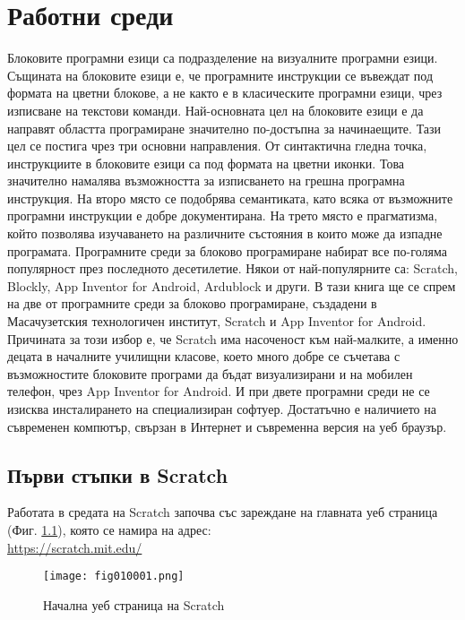 \chapter{Работни среди}

Блоковите програмни езици са подразделение на визуалните програмни езици. Същината на блоковите езици е, че програмните инструкции се въвеждат под формата на цветни блокове, а не както е в класическите програмни езици, чрез изписване на текстови команди. Най-основната цел на блоковите езици е да направят областта програмиране значително по-достъпна за начинаещите. Тази цел се постига чрез три основни направления. От синтактична гледна точка, инструкциите в блоковите езици са под формата на цветни иконки. Това значително намалява възможността за изписването на грешна програмна инструкция. На второ място се подобрява семантиката, като всяка от възможните програмни инструкции е добре документирана. На трето място е прагматизма, който позволява изучаването на различните състояния в които може да изпадне програмата. Програмните среди за блоково програмиране набират все по-голяма популярност през последното десетилетие. Някои от най-популярните са: Scratch, Blockly, App Inventor for Android, Ardublock и други. В тази книга ще се спрем на две от програмните среди за блоково програмиране, създадени в Масачузетския технологичен институт, Scratch и App Inventor for Android. Причината за този избор е, че Scratch има насоченост към най-малките, а именно децата в началните училищни класове, което много добре се съчетава с възможностите блоковите програми да бъдат визуализирани и на мобилен телефон, чрез App Inventor for Android. И при двете програмни среди не се изисква инсталирането на специализиран софтуер. Достатъчно е наличието на съвременен компютър, свързан в Интернет и съвременна версия на уеб браузър. 

\section{Първи стъпки в Scratch}

Работата в средата на Scratch започва със зареждане на главната уеб страница (Фиг. \ref{fig010001}), която се намира на адрес: \\ \href{https://scratch.mit.edu/}{https://scratch.mit.edu/}

\begin{figure}[H]
  \centering
  \texttt{[image: fig010001.png]}
  \caption{Начална уеб страница на Scratch}
\label{fig010001}
\end{figure}

